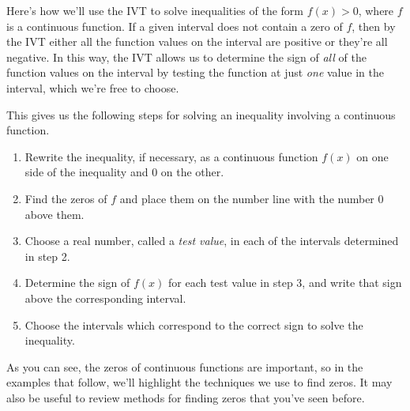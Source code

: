 \documentclass[noauthor, nooutcomes]{ximera}
\begin{document}
Here's how we'll use the IVT to solve inequalities of the form $f(x) > 0$, where $f$ is a continuous function. If a given interval does not contain a zero of $f$, then by the IVT either all the function values on the interval are positive or they're all negative. In this way, the IVT allows us to determine the sign of \emph{all} of the function values on the interval by testing the function at just \emph{one} value in the interval, which we're free to choose. 

This gives us the following steps for solving an inequality involving a continuous function.

\begin{enumerate}

\item  Rewrite the inequality, if necessary, as a continuous function $f(x)$ on one side of the inequality and $0$ on the other.

\item  Find the zeros of $f$ and place them on the number line with the number $0$ above them.

\item  Choose a real number, called a \emph{test value}, in each of the intervals determined in step 2. 

\item  Determine the sign of $f(x)$ for each test value in step 3, and write that sign above the corresponding interval.

\item  Choose the intervals which correspond to the correct sign to solve the inequality.

\end{enumerate}

As you can see, the zeros of continuous functions are important, so in the examples that follow, we'll highlight the techniques we use to find zeros. It may also be useful to review methods for finding zeros that you've seen before.

\end{document}
